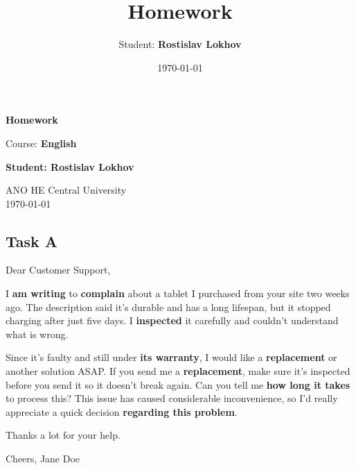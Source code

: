 \documentclass[a4paper,12pt,english]{article}
\title{Homework}
\author{Student: \textbf{Rostislav Lokhov}}
\date{\today}
\begin{document}
\begin{titlepage}
    \centering
    \vspace*{1cm}

    \Huge
    \textbf{Homework}

    \vspace{0.5cm}
    \LARGE
    Course: \textbf{English}

    \vspace{1.5cm}

    \textbf{Student: Rostislav Lokhov}

    \vfill

    \Large
    ANO HE Central University\\
    \vspace{0.3cm}
    \today

\end{titlepage}


\subsection{Task A}
Dear Customer Support,

I \textbf{am writing} to \textbf{complain} about a tablet I purchased from your site two weeks ago. The description said it’s durable and has a long lifespan, but it stopped charging after just five days. I \textbf{inspected} it carefully and couldn’t understand what is wrong.

Since it’s faulty and still under \textbf{its warranty}, I would like a \textbf{replacement} or another solution ASAP. If you send me a \textbf{replacement}, make sure it’s inspected before you send it so it doesn’t break again. Can you tell me \textbf{how long it takes} to process this? This issue has caused considerable inconvenience, so I’d really appreciate a quick decision \textbf{regarding this problem}.

Thanks a lot for your help.

Cheers,
Jane Doe
\end{document}
